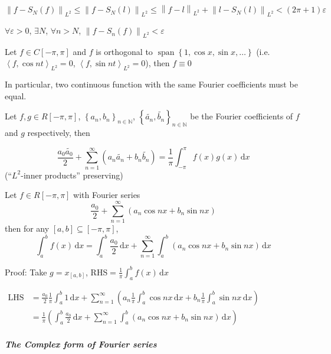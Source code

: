 $$\left\|f-S_N(f)\right\|_{L^2}\leq\left\|f-S_N(l)\right\|_{L^2}\leq\left\|f-l\right\|_{L^2}+\left\|l-S_N(l)\right\|_{L^2}<(2\pi+1)\varepsilon$$

$\forall\varepsilon>0$, $\exists N$, $\forall n>N$, $\left\|f-S_n(f)\right\|_{L^2}<\varepsilon$

\begin{corollary}
    Let $f\in C[-\pi,\pi]$ and $f$ is orthogonal to $\operatorname{span}\left\{1,\cos x,\sin x,\dots\right\}$ (i.e. $\left<f,\cos nt\right>_{L^2}=0$, $\left<f,\sin nt\right>_{L^2}=0$), then $f\equiv 0$

    In particular, two continuous function with the same Fourier coefficients must be equal.
\end{corollary}

\begin{corollary}
    Let $f,g\in R[-\pi,\pi]$, $\left\{a_n,b_n\right\}_{n\in\mathbb{N}}$, $\left\{\tilde{a_n},\tilde{b_n}\right\}_{n\in\mathbb{N}}$ be the Fourier coefficients of $f$ and $g$ respectively, then

    $$\frac{a_0\tilde{a_0}}{2}+\sum_{n=1}^{\infty}\left(a_n\tilde{a_n}+b_n\tilde{b_n}\right)=\frac{1}{\pi}\int_{-\pi}^{\pi}f(x)g(x)\,\mathrm{d}x$$
    (``$L^2$-inner products'' preserving)
\end{corollary}

\begin{corollary}
    Let $f\in R[-\pi,\pi]$ with Fourier series
    $$\frac{a_0}{2}+\sum_{n=1}^{\infty}\left(a_n\cos nx+b_n\sin nx\right)$$
    then for any $[a,b]\subseteq[-\pi,\pi]$,
    $$\int_a^b f(x)\,\mathrm{d}x=\int_a^b\frac{a_0}{2}\,\mathrm{d}x+\sum_{n=1}^{\infty}\int_a^b\left(a_n\cos nx+b_n\sin nx\right)\,\mathrm{d}x$$
\end{corollary}

Proof: Take $g=x_{[a,b]}$, RHS$=\frac{1}{\pi}\int_a^b f(x)\,\mathrm{d}x$

$\begin{aligned}
        \text{LHS} & =\frac{a_0}{2}\frac{1}{\pi}\int_a^b 1\,\mathrm{d}x+\sum_{n=1}^{\infty}\left(a_n\frac{1}{\pi}\int_a^b\cos nx\,\mathrm{d}x+b_n\frac{1}{\pi}\int_a^b\sin nx\,\mathrm{d}x\right) \\
                   & =\frac{1}{\pi}\left(\int_a^b\frac{a_0}{2}\,\mathrm{d}x+\sum_{n=1}^{\infty}\int_a^b\left(a_n\cos nx+b_n\sin nx\right)\,\mathrm{d}x\right)
    \end{aligned}$

\subparagraph*{The Complex form of Fourier series}

